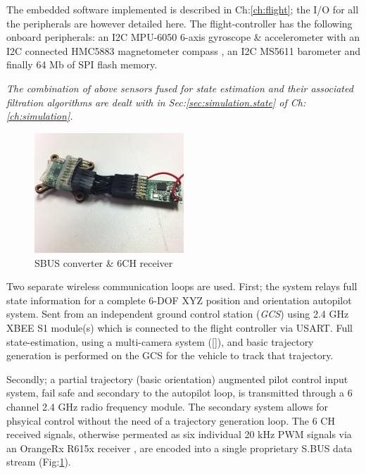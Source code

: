 \par
The embedded software implemented is described in Ch:\ref{ch:flight}; the I/O for all the peripherals are however detailed here. The flight-controller has the following onboard peripherals: an I2C MPU-6050 6-axis gyroscope \& accelerometer \cite{mpu6050} with an I2C connected HMC5883 magnetometer compass \cite{hmc5883}, an I2C MS5611 barometer \cite{ms5611} and finally 64 Mb of SPI flash memory.
\par
\emph{\color{Gray}The combination of above sensors fused for state estimation and their associated filtration algorithms are dealt with in Sec:\ref{sec:simulation.state} of Ch:\ref{ch:simulation}.\\}
\begin{figure}[hbtp]
\centering
\includegraphics[width=0.5\textwidth]{figs/ppm-sbus}
\caption{SBUS converter \& 6CH receiver}
\label{fig:ppm-sbus}
\vspace{-20pt}
\end{figure}
\par
Two separate wireless communication loops are used. First; the system relays full state information for a complete 6-DOF XYZ position and orientation autopilot system. Sent from an independent ground control station (\emph{GCS}) using 2.4 GHz XBEE S1 module(s)\cite{xbees1} which is connected to the flight controller via USART. Full state-estimation, using a multi-camera system (\ref{}), and basic trajectory generation is performed on the GCS for the vehicle to track that trajectory. 
\par
Secondly; a partial trajectory (basic orientation) augmented pilot control input system, fail safe and secondary to the autopilot loop, is transmitted through a 6 channel 2.4 GHz radio frequency module. The secondary system allows for phsyical control without the need of a trajectory generation loop. The 6 CH received signals, otherwise permeated as six individual 20 kHz PWM signals via an OrangeRx R615x receiver \cite{r615x}, are encoded into a single proprietary S.BUS data stream (Fig:\ref{fig:ppm-sbus}). 
